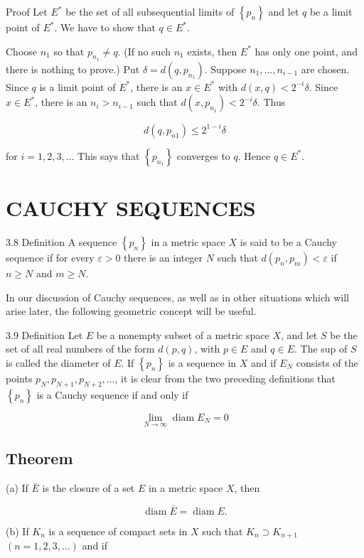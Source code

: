 \documentclass[10pt]{article}
\begin{document}
Proof Let $E^{*}$ be the set of all subsequential limits of $\left\{p_{n}\right\}$ and let $q$ be a limit point of $E^{*}$. We have to show that $q \in E^{*}$.

Choose $n_{1}$ so that $p_{n_{1}} \neq q$. (If no such $n_{1}$ exists, then $E^{*}$ has only one point, and there is nothing to prove.) Put $\delta=d\left(q, p_{n_{1}}\right)$. Suppose $n_{1}, \ldots, n_{i-1}$ are chosen. Since $q$ is a limit point of $E^{*}$, there is an $x \in E^{*}$ with $d(x, q)<2^{-i} \delta$. Since $x \in E^{*}$, there is an $n_{i}>n_{i-1}$ such that $d\left(x, p_{n_{1}}\right)<2^{-i} \delta$. Thus

$$
d\left(q, p_{n 1}\right) \leq 2^{1-i} \delta
$$

for $i=1,2,3, \ldots$ This says that $\left\{p_{n_{1}}\right\}$ converges to $q$. Hence $q \in E^{*}$.

\section{CAUCHY SEQUENCES}
3.8 Definition A sequence $\left\{p_{n}\right\}$ in a metric space $X$ is said to be a Cauchy sequence if for every $\varepsilon>0$ there is an integer $N$ such that $d\left(p_{n}, p_{m}\right)<\varepsilon$ if $n \geq N$ and $m \geq N$.

In our discussion of Cauchy sequences, as well as in other situations which will arise later, the following geometric concept will be useful.

3.9 Definition Let $E$ be a nonempty subset of a metric space $X$, and let $S$ be the set of all real numbers of the form $d(p, q)$, with $p \in E$ and $q \in E$. The sup of $S$ is called the diameter of $E$. If $\left\{p_{n}\right\}$ is a sequence in $X$ and if $E_{N}$ consists of the points $p_{N}, p_{N+1}, p_{N+2}, \ldots$, it is clear from the two preceding definitions that $\left\{p_{n}\right\}$ is a Cauchy sequence if and only if

$$
\lim _{N \rightarrow \infty} \operatorname{diam} E_{N}=0
$$

\subsection{Theorem}
(a) If $\bar{E}$ is the closure of a set $E$ in a metric space $X$, then

$$
\operatorname{diam} \bar{E}=\operatorname{diam} E .
$$

(b) If $K_{n}$ is a sequence of compact sets in $X$ such that $K_{n} \supset K_{n+1}$ $(n=1,2,3, \ldots)$ and if
\end{document}
